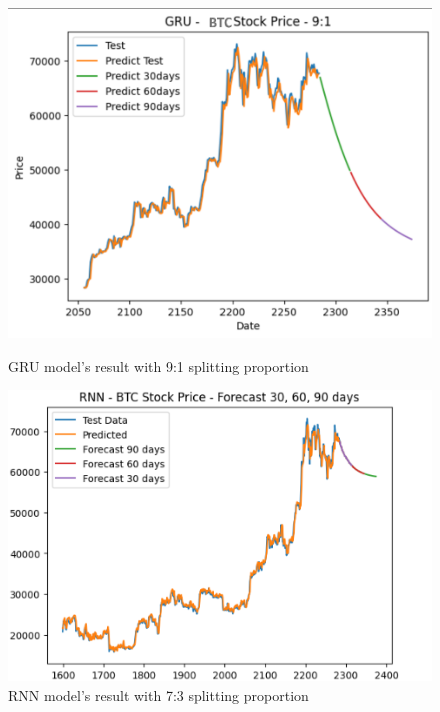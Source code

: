 \documentclass{ieeeojies}
\begin{document}
\begin{figure}[H]
    \centering
    \begin{minipage}{0.23\textwidth}
    \centering
    \includegraphics[width=1\textwidth]{bibliography/Figure/GRU btc 91.png}
    \caption{GRU model's result with 9:1 splitting proportion}
    \label{fig10}
    \end{minipage}
    \hfill
    \begin{minipage}{0.23\textwidth}
    \centering
    \includegraphics[width=1\textwidth]{bibliography/Figure/PREDICT/RNN/RNN-7-3-BTC.png}
    \caption{RNN model's result with 7:3 splitting proportion}
    \label{fig11}
    \end{minipage}
\end{figure}
\end{document}

